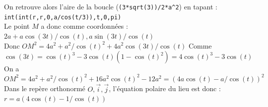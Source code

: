 \documentclass[a4paper,11pt]{book}
\begin{document}
On retrouve alors l'aire de la boucle ({\tt (3*sqrt(3))/2*a\verb|^|2})
 en tapant :\\
{\tt int(int(r,r,0,a/cos(t/3)),t,0,pi)}\\
Le point $M$ a donc comme coordonn\'ees :
$2a+a\cos(3t)/\cos(t),a\sin(3t)/\cos(t)$\\
Donc $OM^2=4a^2+a^2/\cos(t)^2+4a^2\cos(3t)/\cos(t)$
Comme $\cos(3t)=\cos(t)^3-3\cos(t)(1-\cos(t)^2)=4\cos(t)^3-3\cos(t)$ \\
On a $OM^2=4a^2+a^2/\cos(t)^2+16a^2\cos(t)^2-12a^2=(4a\cos(t)-a/\cos(t))^2$\\
Dans le rep\`ere orthonorm\'e $O,\overrightarrow i,\overrightarrow j$, 
l'\'equation polaire du lieu est donc :\\
$r=a(4\cos(t)-1/\cos(t))$\\
\end{document}
